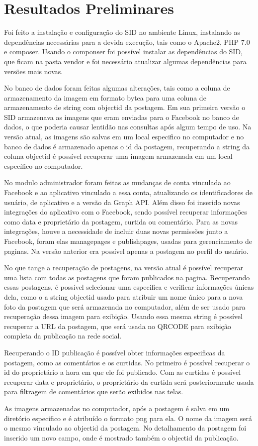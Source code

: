 \chapter[Resultados Preliminares]{Resultados Preliminares}
Foi feito a instalação e configuração do SID no ambiente Linux, instalando as dependências necessárias para a devida execução, tais como o Apache2, PHP 7.0 e composer. Usando o componser foi possível instalar as dependências do SID, que ficam na pasta vendor e foi necessário atualizar algumas dependências para versões mais novas.

No banco de dados foram feitas algumas alterações, tais como a coluna de armazenamento da imagem em formato bytea para uma coluna de armazenamento de string com object\textunderscore{}id da postagem. Em sua primeira versão o SID armazenava as imagens que eram enviadas para o Facebook no banco de dados, o que poderia causar lentidão nas consultas após algum tempo de uso. Na versão atual, as imagens são salvas em um local especifico no computador e no banco de dados é armazenado apenas o id da postagem, recuperando a string da coluna object\textunderscore{}id é possível recuperar uma imagem armazenada em um local específico no computador.

No modulo administrador foram feitas as mudanças de conta vinculada ao Facebook e ao aplicativo vinculado a essa conta, atualizando os identificadores de usuário, de aplicativo e a versão da Graph API. Além disso foi inserido novas integrações do aplicativo com o Facebook, sendo possível recuperar informações como data e proprietário da postagem, curtida ou comentário. Para as novas integrações, houve a necessidade de incluir duas novas permissões junto a Facebook, foram elas manage\textunderscore{}pages e publish\textunderscore{}pages, usadas para gerenciamento de paginas. Na versão anterior era possível apenas a postagem no perfil do usuário.

No que tange a recuperação de postagens, na versão atual é possível recuperar uma lista com todas as postagens que foram publicados na pagina. Recuperando essas postagens, é possível selecionar uma especifica e verificar informações únicas dela, como o a string object\textunderscore{}id usado para atribuir um nome único para a nova foto da postagem que será armazenada no computador, além de ser usado para recuperação dessa imagem para exibição. Usando essa mesma string é possível recuperar a URL da postagem, que será usada no QRCODE para exibição completa da publicação na rede social.

Recuperando o ID publicação é possível obter  informações especificas da postagem, como as comentários e os curtidas. No primeiro é possível recuperar o id do proprietário a hora em que ele foi publicado. Com as curtidas é possível recuperar data e proprietário, o proprietário da curtida será posteriormente usada para filtragem de comentários que serão exibidos nas telas. 

As imagens armazenadas no computador, após a postagem é salva em um diretório especifico e é atribuído o formato png para ela. O nome da imagem será o mesmo vinculado ao object\textunderscore{}id da postagem. No detalhamento da postagem foi inserido um novo campo, onde é mostrado também o object\textunderscore{}id da publicação.